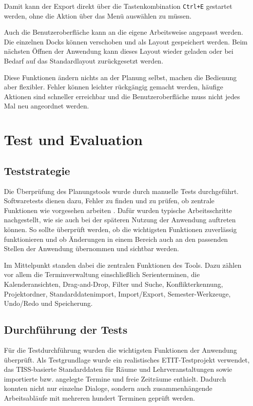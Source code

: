 \documentclass[12pt,a4paper]{article}
\begin{document}
Damit kann der Export direkt über die Tastenkombination \texttt{Ctrl+E} gestartet werden, ohne die Aktion über das Menü auswählen zu müssen.


Auch die Benutzeroberfläche kann an die eigene Arbeitsweise angepasst werden. Die einzelnen Docks können verschoben und als Layout gespeichert werden. Beim nächsten Öffnen der Anwendung kann dieses Layout wieder geladen oder bei Bedarf auf das Standardlayout zurückgesetzt werden.

Diese Funktionen ändern nichts an der Planung selbst, machen die Bedienung aber flexibler. Fehler können leichter rückgängig gemacht werden, häufige Aktionen sind schneller erreichbar und die Benutzeroberfläche muss nicht jedes Mal neu angeordnet werden.

\clearpage

\section{Test und Evaluation}

\subsection{Teststrategie}

Die Überprüfung des Planungstools wurde durch manuelle Tests durchgeführt. Softwaretests dienen dazu, Fehler zu finden und zu prüfen, ob zentrale Funktionen wie vorgesehen arbeiten \cite{sommerville2016software}. Dafür wurden typische Arbeitsschritte nachgestellt, wie sie auch bei der späteren Nutzung der Anwendung auftreten können. So sollte überprüft werden, ob die wichtigsten Funktionen zuverlässig funktionieren und ob Änderungen in einem Bereich auch an den passenden Stellen der Anwendung übernommen und sichtbar werden.

Im Mittelpunkt standen dabei die zentralen Funktionen des Tools. Dazu zählen vor allem die Terminverwaltung einschließlich Serienterminen, die Kalenderansichten, Drag-and-Drop, Filter und Suche, Konflikterkennung, Projektordner, Standarddatenimport, Import/Export, Semester-Werkzeuge, Undo/Redo und Speicherung.


\subsection{Durchführung der Tests}

Für die Testdurchführung wurden die wichtigsten Funktionen der Anwendung überprüft.
Als Testgrundlage wurde ein realistisches ETIT-Testprojekt verwendet, das TISS-basierte Standarddaten für Räume und Lehrveranstaltungen sowie importierte bzw. angelegte Termine und freie Zeiträume enthielt.
Dadurch konnten nicht nur einzelne Dialoge, sondern auch zusammenhängende Arbeitsabläufe mit mehreren hundert Terminen geprüft werden.
\end{document}
